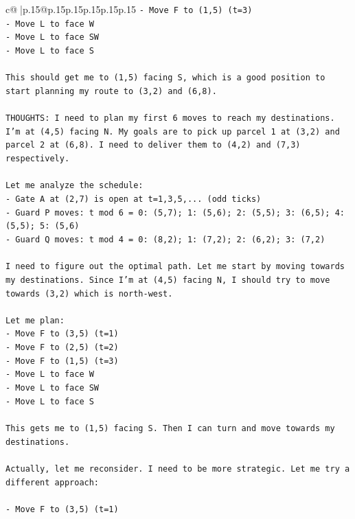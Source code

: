 \documentclass{article}
\begin{document}
{\begin{supertabular}{c@{$\;$}|p{.15\linewidth}@{}p{.15\linewidth}p{.15\linewidth}p{.15\linewidth}p{.15\linewidth}p{.15\linewidth}}
{{{\texttt{{-} Move F to (1,5) (t=3)} \\
\texttt{{-} Move L to face W} \\
\texttt{{-} Move L to face SW} \\
\texttt{{-} Move L to face S} \\
\\ 
\texttt{This should get me to (1,5) facing S, which is a good position to start planning my route to (3,2) and (6,8).} \\
\\ 
\texttt{THOUGHTS: I need to plan my first 6 moves to reach my destinations. I'm at (4,5) facing N. My goals are to pick up parcel 1 at (3,2) and parcel 2 at (6,8). I need to deliver them to (4,2) and (7,3) respectively.} \\
\\ 
\texttt{Let me analyze the schedule:} \\
\texttt{{-} Gate A at (2,7) is open at t=1,3,5,... (odd ticks)} \\
\texttt{{-} Guard P moves: t mod 6 = 0: (5,7); 1: (5,6); 2: (5,5); 3: (6,5); 4: (5,5); 5: (5,6)} \\
\texttt{{-} Guard Q moves: t mod 4 = 0: (8,2); 1: (7,2); 2: (6,2); 3: (7,2)} \\
\\ 
\texttt{I need to figure out the optimal path. Let me start by moving towards my destinations. Since I'm at (4,5) facing N, I should try to move towards (3,2) which is north{-}west.} \\
\\ 
\texttt{Let me plan:} \\
\texttt{{-} Move F to (3,5) (t=1)} \\
\texttt{{-} Move F to (2,5) (t=2)} \\
\texttt{{-} Move F to (1,5) (t=3)} \\
\texttt{{-} Move L to face W} \\
\texttt{{-} Move L to face SW} \\
\texttt{{-} Move L to face S} \\
\\ 
\texttt{This gets me to (1,5) facing S. Then I can turn and move towards my destinations.} \\
\\ 
\texttt{Actually, let me reconsider. I need to be more strategic. Let me try a different approach:} \\
\\ 
\texttt{{-} Move F to (3,5) (t=1)} \\
}}}
\end{supertabular}}
\end{document}
